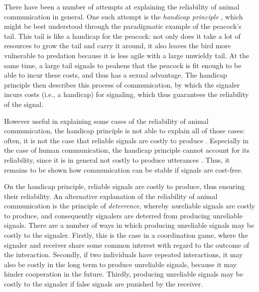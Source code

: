 There have been a number of attempts at explaining the reliability of animal communication in general. One such attempt is the \emph{handicap principle} \citep{Zahavi75, Zahavi99}, which might be best understood through the paradigmatic example of the peacock's tail. This tail is like a handicap for the peacock: not only does it take a lot of resources to grow the tail and carry it around, it also leaves the bird more vulnerable to predation because it is less agile with a large unwieldy tail. At the same time, a large tail signals to peahens that the peacock is fit enough to be able to incur these costs, and thus has a sexual advantage.
The handicap principle then describes this process of communication, by which the signaler incurs costs (i.e., a handicap) for signaling, which thus guarantees the reliability of the signal.

However useful in explaining some cases of the reliability of animal communication, the handicap principle is not able to explain all of those cases: often, it is not the case that reliable signals are costly to produce \citep{Scott-Phillips08} . Especially in the case of human communication, the handicap principle cannot account for its reliability, since it is in general not costly to produce utterances \citep{Scott-Phillips08}.
Thus, it remains to be shown how communication can be stable if signals are cost-free.

On the handicap principle, reliable signals are costly to produce, thus ensuring their reliability. An alternative explanation of the reliability of animal communication is the principle of \emph{deterrence}, whereby \emph{un}reliable signals are costly to produce, and consequently signalers are deterred from producing unreliable signals.
There are a number of ways in which producing unreliable signals may be costly to the signaler. Firstly, this is the case in a coordination game, where the signaler and receiver share some common interest with regard to the outcome of the interaction.
Secondly, if two individuals have repeated interactions, it may also be costly in the long term to produce unreliable signals, because it may hinder cooperation in the future.
Thirdly, producing unreliable signals may be costly to the signaler if false signals are punished by the receiver.

